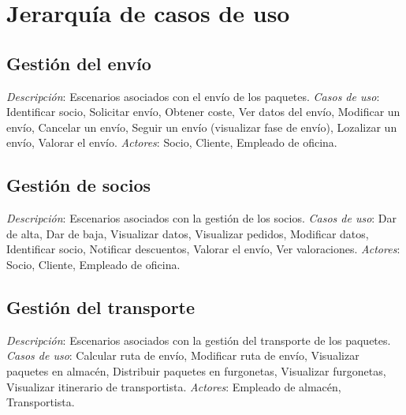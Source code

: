 \section{Jerarquía de casos de uso}
\subsection{Gestión del envío}	
\textit{Descripción}: \newline
Escenarios asociados con el envío de los paquetes. \newline
\textit{Casos de uso}: \newline
 Identificar socio, Solicitar envío, Obtener coste, Ver datos del envío, Modificar un envío, Cancelar un envío, Seguir un envío (visualizar fase de envío), Lozalizar un envío, Valorar el envío. \newline
\textit{Actores}: \newline
Socio, Cliente, Empleado de oficina.
\subsection{Gestión de socios}	
\textit{Descripción}: \newline
Escenarios asociados con la gestión de los socios. \newline
\textit{Casos de uso}: \newline
 Dar de alta, Dar de baja, Visualizar datos, Visualizar pedidos, Modificar datos, Identificar socio, Notificar descuentos, Valorar el envío, Ver valoraciones. \newline
\textit{Actores}: \newline
Socio, Cliente, Empleado de oficina.
\subsection{Gestión del transporte}	
\textit{Descripción}: \newline
Escenarios asociados con la gestión del transporte de los paquetes. \newline
\textit{Casos de uso}: \newline
 Calcular ruta de envío, Modificar ruta de envío, Visualizar paquetes en almacén, Distribuir paquetes en furgonetas, Visualizar furgonetas, Visualizar itinerario de transportista. \newline
\textit{Actores}: \newline
Empleado de almacén, Transportista.

\newpage

